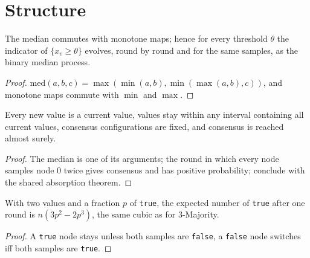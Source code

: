 \section{Structure}
\begin{theorem}\label{thm:threshold}
\leanok{}
The median commutes with monotone maps; hence for every threshold $\theta$ the indicator of
$\{x_v\ge\theta\}$ evolves, round by round and for the same samples, as the binary median process.
\end{theorem}
\begin{proof}\leanok
$\mathrm{med}(a,b,c)=\max(\min(a,b),\min(\max(a,b),c))$, and monotone maps commute with $\min$ and $\max$.
\end{proof}
\begin{theorem}\label{thm:basic}
\leanok{}
Every new value is a current value, values stay within any interval containing all current
values, consensus configurations are fixed, and consensus is reached almost surely.
\end{theorem}
\begin{proof}\leanok
The median is one of its arguments; the round in which every node samples node $0$ twice gives
consensus and has positive probability; conclude with the shared absorption theorem.
\end{proof}
\begin{theorem}\label{thm:expect}
\leanok{}
With two values and a fraction $p$ of \texttt{true}, the expected number of \texttt{true} after one
round is $n(3p^2-2p^3)$, the same cubic as for 3-Majority.
\end{theorem}
\begin{proof}\leanok
A \texttt{true} node stays unless both samples are \texttt{false}, a \texttt{false} node switches iff
both samples are \texttt{true}.
\end{proof}

